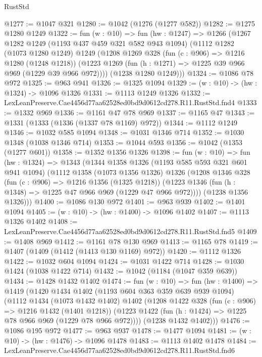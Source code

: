 \begin{lexlean}{RustStd}
\begin{coremodule}
@1277 := @1047 @321
@1280 := @1042 (@1276 (@1277 @582))
@1282 := @1275 @1280 @1249
@1322 := fun (w : @10) =>
  fun (hw : @1247) =>
  @1266
    (@1267
      @1282
      @1249
      (@1193 @437 @459 @321 @582 @943 @1094)
      (@1112
        @1282
        (@1073 @1280 @1249)
        @1249
        (@1208
          @1269
          @328
          (fun (c : @906) => @1216 @1280 (@1248 @1218))
          (@1223 @1269 (fun (h : @1271) => @1225 @39 @966 @969 (@1229 @39 @966 @972))))
        (@1238 @1280 @1249)))
@1324 := @1086 @78 @972
@1325 := @963 @941
@1326 := @1325 @1094
@1329 := (w : @10) -> (hw : @1324) -> @1096 @1326
@1331 := @1113 @1249 @1326
@1332 := LexLeanPreserve.Cae4456d77aa62528ed0bd9d0612cd278.R11.RustStd.fnd4
@1333 := @1332 @969
@1336 := @1161 @47 @78 @969
@1337 := @1165 @47
@1343 := @1331 (@1333 (@1336 (@1337 @78 @1169) @972))
@1344 := @1112 @1249
@1346 := @1032 @585 @1094
@1348 := @1031 @1346 @714
@1352 := @1030 @1348 (@1038 @1346 @714)
@1353 := @1044 @593
@1356 := @1042 (@1353 (@1277 @601))
@1358 := @1352 @1356 @1326
@1398 := fun (w : @10) =>
  fun (hw : @1324) =>
  @1343
    (@1344
      @1358
      @1326
      (@1193 @585 @593 @321 @601 @941 @1094)
      (@1112
        @1358
        (@1073 @1356 @1326)
        @1326
        (@1208
          @1346
          @328
          (fun (c : @906) => @1216 @1356 (@1325 @1218))
          (@1223 @1346 (fun (h : @1348) => @1225 @47 @966 @969 (@1229 @47 @966 @972))))
        (@1238 @1356 @1326)))
@1400 := @1086 @130 @972
@1401 := @963 @939
@1402 := @1401 @1094
@1405 := (w : @10) -> (hw : @1400) -> @1096 @1402
@1407 := @1113 @1326 @1402
@1408 := LexLeanPreserve.Cae4456d77aa62528ed0bd9d0612cd278.R11.RustStd.fnd5
@1409 := @1408 @969
@1412 := @1161 @78 @130 @969
@1413 := @1165 @78
@1419 := @1407 (@1409 (@1412 (@1413 @130 @1169) @972))
@1420 := @1112 @1326
@1422 := @1032 @604 @1094
@1424 := @1031 @1422 @714
@1428 := @1030 @1424 (@1038 @1422 @714)
@1432 := @1042 (@1184 (@1047 @359 @639))
@1434 := @1428 @1432 @1402
@1474 := fun (w : @10) =>
  fun (hw : @1400) =>
  @1419
    (@1420
      @1434
      @1402
      (@1193 @604 @363 @359 @639 @939 @1094)
      (@1112
        @1434
        (@1073 @1432 @1402)
        @1402
        (@1208
          @1422
          @328
          (fun (c : @906) => @1216 @1432 (@1401 @1218))
          (@1223 @1422 (fun (h : @1424) => @1225 @78 @966 @969 (@1229 @78 @966 @972))))
        (@1238 @1432 @1402)))
@1476 := @1086 @195 @972
@1477 := @963 @937
@1478 := @1477 @1094
@1481 := (w : @10) -> (hw : @1476) -> @1096 @1478
@1483 := @1113 @1402 @1478
@1484 := LexLeanPreserve.Cae4456d77aa62528ed0bd9d0612cd278.R11.RustStd.fnd6

\end{coremodule}
\end{lexlean}
